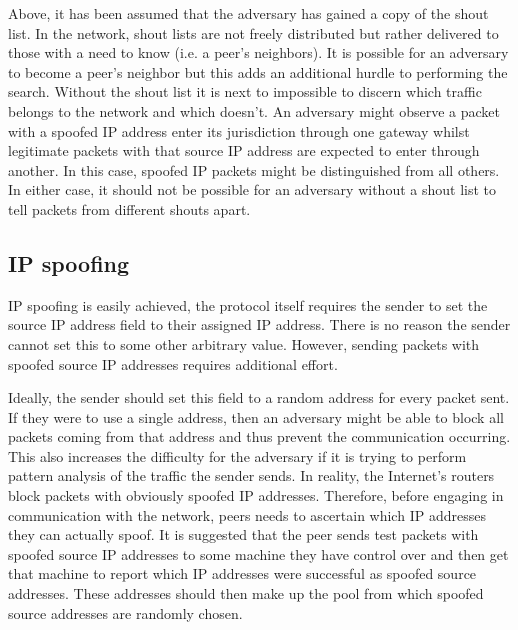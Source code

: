 \documentclass[ %
                    author={Luke Murray},
                supervisor={Dr. Simon Hollis},
                     title={Shadow Peer-to-Peer Networks},
                  subtitle={},
                    degree={MEng},
                      year={2013} ]{thesis}
\begin{document}
Above, it has been assumed that the adversary has gained a copy of the shout list. In the network, shout lists are not freely distributed but rather delivered to those with a need to know (i.e. a peer's neighbors). It is possible for an adversary to become a peer's neighbor but this adds an additional hurdle to performing the search. Without the shout list it is next to impossible to discern which traffic belongs to the network and which doesn't. An adversary might observe a packet with a spoofed IP address enter its jurisdiction through one gateway whilst legitimate packets with that source IP address are expected to enter through another. In this case, spoofed IP packets might be distinguished from all others. In either case, it should not be possible for an adversary without a shout list to tell packets from different shouts apart.


\subsection{IP spoofing}

IP spoofing is easily achieved, the protocol itself requires the sender to set the source IP address field to their assigned IP address. There is no reason the sender cannot set this to some other arbitrary value. However, sending packets with spoofed source IP addresses requires additional effort.

Ideally, the sender should set this field to a random address for every packet sent. If they were to use a single address, then an adversary might be able to block all packets coming from that address and thus prevent the communication occurring. This also increases the difficulty for the adversary if it is trying to perform pattern analysis of the traffic the sender sends. In reality, the Internet's routers block packets with obviously spoofed IP addresses. Therefore, before engaging in communication with the network, peers needs to ascertain which IP addresses they can actually spoof. It is suggested that the peer sends test packets with spoofed source IP addresses to some machine they have control over and then get that machine to report which IP addresses were successful as spoofed source addresses. These addresses should then make up the pool from which spoofed source addresses are randomly chosen.

\end{document}
